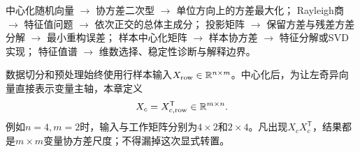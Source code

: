 \begin{dependencybox}
中心化随机向量 $\to$ 协方差二次型 $\to$ 单位方向上的方差最大化；
Rayleigh商 $\to$ 特征值问题 $\to$ 依次正交的总体主成分；
投影矩阵 $\to$ 保留方差与残差方差分解 $\to$ 最小重构误差；
样本中心化矩阵 $\to$ 样本协方差 $\to$ 特征分解或SVD实现；
特征值谱 $\to$ 维数选择、稳定性诊断与解释边界。
\end{dependencybox}

\begin{keypointbox}[title=数据方向桥：PCA输入与工作矩阵]
数据切分和预处理始终使用行样本输入$X_{\rm row}\in\mathbb R^{n\times m}$。中心化后，为让左奇异向量直接表示变量主轴，本章定义
\[
X_c=X_{c,{\rm row}}^{\mathsf T}\in\mathbb R^{m\times n}.
\]
例如$n=4,m=2$时，输入与工作矩阵分别为$4\times2$和$2\times4$。凡出现$X_cX_c^{\mathsf T}$，结果都是$m\times m$变量协方差尺度；不得漏掉这次显式转置。
\end{keypointbox}

